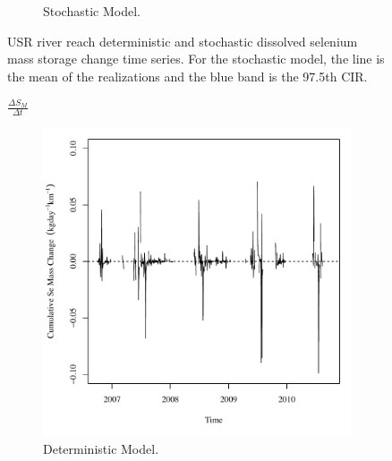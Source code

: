 \begin{linenumbers}
\begin{landscape}
\begin{figure}
\begin{subfigure}{0.7\textwidth}
			\caption{Stochastic Model.}
		\end{subfigure}
		\caption[USR river reach deterministic and stochastic dissolved selenium mass storage change time series.]{USR river reach deterministic and stochastic dissolved selenium mass storage change time series.  For the stochastic model, the line is the mean of the realizations and the blue band is the 97.5th CIR.}
		\label{fig:massStoreChange_USR}
	\end{figure}
\end{landscape}

\subfiguretop
\begin{landscape}
	\begin{figure}
		$ \displaystyle \frac{\Delta S_{M}}{\Delta t} $
		\begin{subfigure}{0.7\textwidth}
			\centering
			\includegraphics[width=\tableCustomSize]{"Figures/Results_DSR/Deterministic/Balance Mass - Storage"}
			\caption{Deterministic Model.}
		\end{subfigure}%
		\begin{subfigure}{0.7\textwidth}
			\centering

\end{subfigure}
\end{figure}
\end{landscape}
\end{linenumbers}
